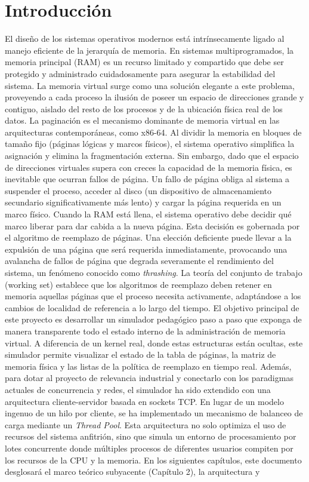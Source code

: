 \documentclass[12pt,letterpaper]{article}
\begin{document}
\newpage
\tableofcontents
\newpage
\listoffigures
\newpage
\listoftables
\newpage

\section{Introducción}

El diseño de los sistemas operativos modernos está intrínsecamente ligado al manejo eficiente de la jerarquía de memoria. En sistemas multiprogramados, la memoria principal (RAM) es un recurso limitado y compartido que debe ser protegido y administrado cuidadosamente para asegurar la estabilidad del sistema. La memoria virtual surge como una solución elegante a este problema, proveyendo a cada proceso la ilusión de poseer un espacio de direcciones grande y contiguo, aislado del resto de los procesos y de la ubicación física real de los datos. La paginación es el mecanismo dominante de memoria virtual en las arquitecturas contemporáneas, como x86-64. Al dividir la memoria en bloques de tamaño fijo (páginas lógicas y marcos físicos), el sistema operativo simplifica la asignación y elimina la fragmentación externa. Sin embargo, dado que el espacio de direcciones virtuales supera con creces la capacidad de la memoria física, es inevitable que ocurran fallos de página. Un fallo de página obliga al sistema a suspender el proceso, acceder al disco (un dispositivo de almacenamiento secundario significativamente más lento) y cargar la página requerida en un marco físico. Cuando la RAM está llena, el sistema operativo debe decidir qué marco liberar para dar cabida a la nueva página. Esta decisión es gobernada por el algoritmo de reemplazo de páginas. Una elección deficiente puede llevar a la expulsión de una página que será requerida inmediatamente, provocando una avalancha de fallos de página que degrada severamente el rendimiento del sistema, un fenómeno conocido como \textit{thrashing}. La teoría del conjunto de trabajo (working set) establece que los algoritmos de reemplazo deben retener en memoria aquellas páginas que el proceso necesita activamente, adaptándose a los cambios de localidad de referencia a lo largo del tiempo. El objetivo principal de este proyecto es desarrollar un simulador pedagógico paso a paso que exponga de manera transparente todo el estado interno de la administración de memoria virtual. A diferencia de un kernel real, donde estas estructuras están ocultas, este simulador permite visualizar el estado de la tabla de páginas, la matriz de memoria física y las listas de la política de reemplazo en tiempo real. Además, para dotar al proyecto de relevancia industrial y conectarlo con los paradigmas actuales de concurrencia y redes, el simulador ha sido extendido con una arquitectura cliente-servidor basada en sockets TCP. En lugar de un modelo ingenuo de un hilo por cliente, se ha implementado un mecanismo de balanceo de carga mediante un \textit{Thread Pool}. Esta arquitectura no solo optimiza el uso de recursos del sistema anfitrión, sino que simula un entorno de procesamiento por lotes concurrente donde múltiples procesos de diferentes usuarios compiten por los recursos de la CPU y la memoria. En los siguientes capítulos, este documento desglosará el marco teórico subyacente (Capítulo 2), la arquitectura y 
\end{document}
